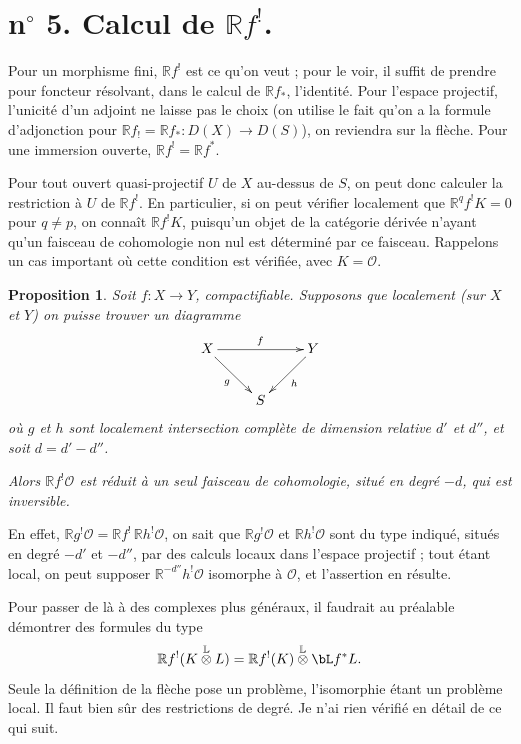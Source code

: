 \documentclass[12pt]{amsart}
\theoremstyle{plain}
\newtheorem{prop}{Proposition}[section]
\theoremstyle{definition}
\newcommand{\cO}{\mathcal{O}}
\newcommand{\cD}{D}
\newcommand{\bR}{\mathbb{R}}
\begin{document}
\section*{n$^{\circ}$ 5. Calcul de $\bR f^{!}$.}

Pour un morphisme fini, $\bR f^{!}$ est ce qu'on veut ; pour le voir, il suffit de prendre pour foncteur r\'esolvant, dans le calcul de $\bR f_{*}$, l'identit\'e. Pour l'espace projectif, l'unicit\'e d'un adjoint ne laisse pas le choix (on utilise le fait qu'on a la formule d'adjonction pour $\bR f_{!} = \bR f_{*}: \cD(X) \to \cD(S)$), on reviendra sur la fl\`eche. Pour une immersion ouverte, $\bR f^{!} = \bR f^{*}$.

Pour tout ouvert quasi-projectif $U$ de $X$ au-dessus de $S$, on peut donc calculer la restriction \`a $U$ de $\bR f^{!}$. En particulier, si on peut v\'erifier localement que $\bR^{q}f^{!}K = 0$ pour $q \neq p$, on conna\^it $\bR f^{!}K$, puisqu'un objet de la cat\'egorie d\'eriv\'ee n'ayant qu'un faisceau de cohomologie non nul est d\'etermin\'e par ce faisceau. Rappelons un cas important o\`u cette condition est v\'erifi\'ee, avec $K = \cO$.

\begin{prop}
Soit $f: X \to Y$, compactifiable. Supposons que localement (sur $X$ et $Y$) on puisse trouver un diagramme
\[
\xymatrix{
X \ar[rr]^{f} \ar[dr]_{g} && Y \ar[dl]^{h} \\
& S &
}
\]
o\`u $g$ et $h$ sont localement intersection compl\`ete de dimension relative $d'$ et $d''$, et soit $d = d' - d''$.

Alors $\bR f^{!}\cO$ est r\'eduit \`a un seul faisceau de cohomologie, situ\'e en degr\'e $-d$, qui est inversible.
\end{prop}

En effet, $\bR g^{!}\cO = \bR f^{!}\,\bR h^{!}\cO$, on sait que $\bR g^{!}\cO$ et $\bR h^{!}\cO$ sont du type indiqu\'e, situ\'es en degr\'e $-d'$ et $-d''$, par des calculs locaux dans l'espace projectif ; tout \'etant local, on peut supposer $\bR^{-d''}h^{!}\cO$ isomorphe \`a $\cO$, et l'assertion en r\'esulte.

Pour passer de l\`a \`a des complexes plus g\'en\'eraux, il faudrait au pr\'ealable d\'emontrer des formules du type
\[
\bR f^{!}(K \overset{\mathbb{L}}{\otimes} L) = \bR f^{!}(K) \overset{\mathbb{L}}{\otimes} \bL f^{*}L.
\]
Seule la d\'efinition de la fl\`eche pose un probl\`eme, l'isomorphie \'etant un probl\`eme local. Il faut bien s\^ur des restrictions de degr\'e. Je n'ai rien v\'erifi\'e en d\'etail de ce qui suit.
\end{document}

